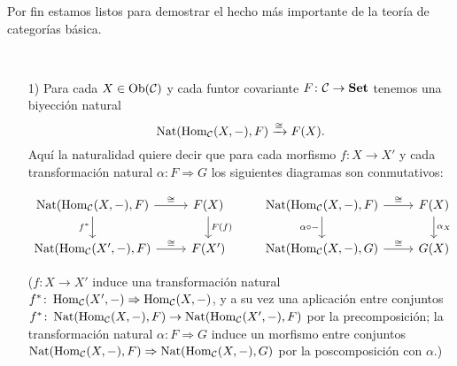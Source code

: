 \documentclass{article}
\numberwithin{equation}{section}
\theoremstyle{definition}
\begin{document}
Por fin estamos listos para demostrar el hecho más importante de la teoría de
categorías básica.

\begin{proposicion}
  \label{lema-de-yoneda}
  ~

  \begin{enumerate}
  \item[1)] Para cada $X\in \operatorname{Ob}(\mathcal{C})$ y cada funtor covariante
    $F\colon \mathcal{C} \to \text{\bf Set}$ tenemos una biyección natural
    $$\operatorname{Nat} (\operatorname{Hom}_\mathcal{C} (X,-), F) \xrightarrow{\cong} F (X).$$
    Aquí la naturalidad quiere decir que para cada morfismo $f\colon X\to X'$ y
    cada transformación natural $\alpha\colon F\Rightarrow G$ los siguientes
    diagramas son conmutativos:

    \[ \begin{tikzcd}
        \Nat (\Hom_\vcateg{C} (X, -), F)\ar{d}[swap]{f^*}\ar{r}{\isom} & F (X)\ar{d}{F (f)} & \Nat (\Hom_\vcateg{C} (X, -), F)\ar{d}[swap]{\alpha\circ -}\ar{r}{\isom} & F (X)\ar{d}{\alpha_X} \\
        \Nat (\Hom_\vcateg{C} (X', -), F) \ar{r}{\isom} & F (X') & \Nat (\Hom_\vcateg{C} (X, -), G) \ar{r}{\isom} & G (X)
      \end{tikzcd} \]

    ($f\colon X\to X'$ induce una transformación natural
    $f^*\colon \operatorname{Hom}_\mathcal{C} (X', -) \Rightarrow \operatorname{Hom}_\mathcal{C} (X, -)$, y a
    su vez una aplicación entre conjuntos
    $f^*\colon \operatorname{Nat} (\operatorname{Hom}_\mathcal{C} (X, -), F) \to \operatorname{Nat} (\operatorname{Hom}_\mathcal{C} (X', -), F)$
    por la precomposición; la transformación natural
    $\alpha\colon F\Rightarrow G$ induce un morfismo entre conjuntos
    $\operatorname{Nat} (\operatorname{Hom}_\mathcal{C} (X,-), F) \Rightarrow \operatorname{Nat} (\operatorname{Hom}_\mathcal{C} (X,-),
    G)$ por la poscomposición con $\alpha$.)


\end{enumerate}
\end{proposicion}
\end{document}
